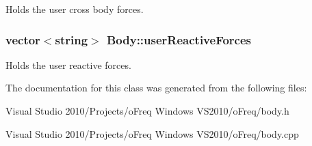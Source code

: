 Holds the user cross body forces. \hypertarget{class_body_af74f87986817f8c5cbd8408b29d04063}{
\subsubsection[{user\-Reactive\-Forces}]{\setlength{\rightskip}{0pt plus 5cm}vector$<$string$>$ Body\-::user\-Reactive\-Forces}}\label{class_body_af74f87986817f8c5cbd8408b29d04063}
Holds the user reactive forces. 

The documentation for this class was generated from the following files\-:\begin{DoxyCompactItemize}
\item 
Visual Studio 2010/\-Projects/o\-Freq Windows V\-S2010/o\-Freq/body.\-h\item 
Visual Studio 2010/\-Projects/o\-Freq Windows V\-S2010/o\-Freq/body.\-cpp\end{DoxyCompactItemize}
